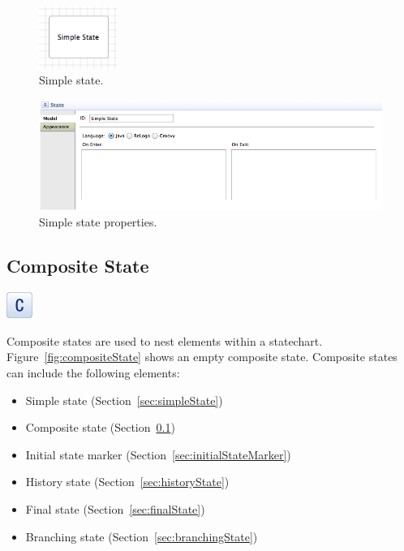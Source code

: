 \documentclass[11pt]{amsart}
\begin{document}
\begin{figure}
\begin{center}
\vspace{.2in}
\centerline {
\includegraphics[width=1in]{StatechartsImages/SimpleState.png}
}
\caption{Simple state.}
\label{fig:simpleState}
\end{center}
\end{figure}

\begin{figure}
\begin{center}
\vspace{.2in}
\centerline {
\includegraphics[width=5in]{StatechartsImages/SimpleStateProperties.png}
}
\caption{Simple state properties.}
\label{fig:simpleStateProperties}
\end{center}
\end{figure}

\clearpage

\subsection{Composite State}
\label{sec:compositeState}
\includegraphics[height=.2in]{StatechartsImages/Composite-State-32.png}

Composite states are used to nest elements within a statechart. Figure~\ref{fig:compositeState} shows an empty composite state. Composite states can include the following elements:
\begin{itemize}
\item Simple state (Section~\ref{sec:simpleState})
\item Composite state (Section~\ref{sec:compositeState})
\item Initial state marker (Section~\ref{sec:initialStateMarker})
\item History state (Section~\ref{sec:historyState})
\item Final state (Section~\ref{sec:finalState})
\item Branching state (Section~\ref{sec:branchingState})

\end{itemize}
\end{document}
